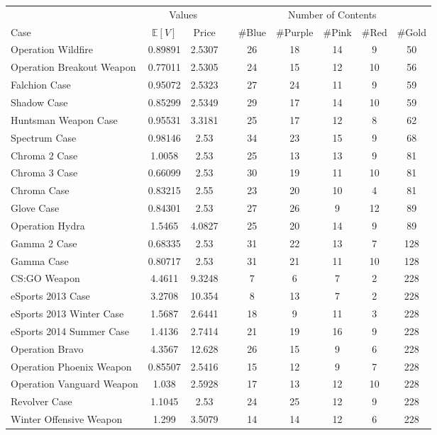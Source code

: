 \documentclass[12pt]{paper}
\begin{document}
\begin{minipage}{\linewidth}
  \centering
  \begin{tabular}{@{}lcccccccc@{}}\toprule
    & \multicolumn{2}{c}{Values} & &\multicolumn{5}{c}{Number of Contents}\\
    \cmidrule{2-3} \cmidrule{5-9}
  Case & $\mathbb{E}[V]$ & Price &\quad& \#Blue & \#Purple & \#Pink & \#Red & \#Gold\\\midrule
Operation Wildfire  & 0.89891 & 2.5307 &\quad& 26 & 18 & 14 & 9 & 50\\
Operation Breakout Weapon  & 0.77011 & 2.5305 &\quad& 24 & 15 & 12 & 10 & 56\\
Falchion Case  & 0.95072 & 2.5323 &\quad& 27 & 24 & 11 & 9 & 59\\
Shadow Case  & 0.85299 & 2.5349 &\quad& 29 & 17 & 14 & 10 & 59\\
Huntsman Weapon Case  & 0.95531 & 3.3181 &\quad& 25 & 17 & 12 & 8 & 62\\
Spectrum Case  & 0.98146 & 2.53 &\quad& 34 & 23 & 15 & 9 & 68\\
Chroma 2 Case  & 1.0058 & 2.53 &\quad& 25 & 13 & 13 & 9 & 81\\
Chroma 3 Case  & 0.66099 & 2.53 &\quad& 30 & 19 & 11 & 10 & 81\\
Chroma Case  & 0.83215 & 2.55 &\quad& 23 & 20 & 10 & 4 & 81\\
Glove Case  & 0.84301 & 2.53 &\quad& 27 & 26 & 9 & 12 & 89\\
Operation Hydra  & 1.5465 & 4.0827 &\quad& 25 & 20 & 14 & 9 & 89\\
Gamma 2 Case  & 0.68335 & 2.53 &\quad& 31 & 22 & 13 & 7 & 128\\
Gamma Case & 0.80717 & 2.53 &\quad& 31 & 21 & 11 & 10 & 128\\\hline
CS:GO Weapon  & 4.4611 & 9.3248 &\quad& 7 & 6 & 7 & 2 & 228\\
eSports 2013 Case  & 3.2708 & 10.354 &\quad& 8 & 13 & 7 & 2 & 228\\
eSports 2013 Winter Case  & 1.5687 & 2.6441 &\quad& 18 & 9 & 11 & 3 & 228\\
eSports 2014 Summer Case  & 1.4136 & 2.7414 &\quad& 21 & 19 & 16 & 9 & 228\\
Operation Bravo  & 4.3567 & 12.628 &\quad& 26 & 15 & 9 & 6 & 228\\
Operation Phoenix Weapon  & 0.85507 & 2.5416 &\quad& 15 & 12 & 9 & 7 & 228\\
Operation Vanguard Weapon  & 1.038 & 2.5928 &\quad& 17 & 13 & 12 & 10 & 228\\
Revolver Case  & 1.1045 & 2.53 &\quad& 24 & 25 & 12 & 9 & 228\\
Winter Offensive Weapon  & 1.299 & 3.5079 &\quad& 14 & 14 & 12 & 6 & 228\\\bottomrule
  \end{tabular}
  
\end{minipage}
\end{document}
